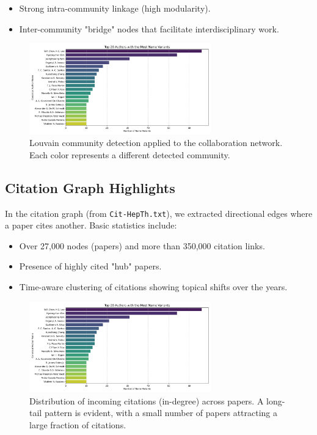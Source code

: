\documentclass[12pt]{article}
\begin{document}
\begin{itemize}
    \item Strong intra-community linkage (high modularity).
    \item Inter-community "bridge" nodes that facilitate interdisciplinary work.
\end{itemize}

\begin{figure}[H]
    \centering
    \includegraphics[width=0.7\textwidth]{pictures/top_author_name_variants.png}
    \caption{Louvain community detection applied to the collaboration network. Each color represents a different detected community.}
\end{figure}

\subsection{Citation Graph Highlights}
In the citation graph (from \texttt{Cit-HepTh.txt}), we extracted directional edges where a paper cites another. Basic statistics include:

\begin{itemize}
    \item Over 27,000 nodes (papers) and more than 350,000 citation links.
    \item Presence of highly cited "hub" papers.
    \item Time-aware clustering of citations showing topical shifts over the years.
\end{itemize}

\begin{figure}[H]
    \centering
    \includegraphics[width=0.7\textwidth]{pictures/top_author_name_variants.png}
    \caption{Distribution of incoming citations (in-degree) across papers. A long-tail pattern is evident, with a small number of papers attracting a large fraction of citations.}
\end{figure}
\end{document}
